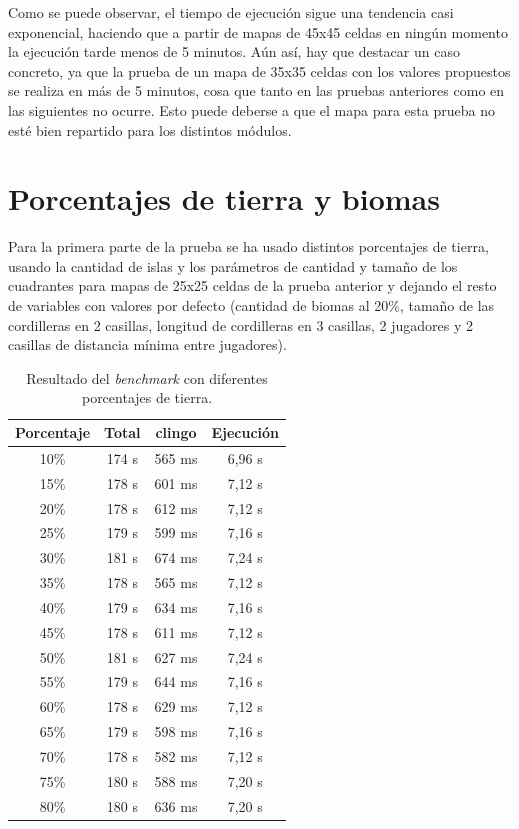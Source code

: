 Como se puede observar, el tiempo de ejecución sigue una tendencia casi exponencial, haciendo que a partir de mapas de 45x45 celdas en ningún momento la ejecución tarde menos de 5 minutos. Aún así, hay que destacar un caso concreto, ya que la prueba de un mapa de 35x35 celdas con los valores propuestos se realiza en más de 5 minutos, cosa que tanto en las pruebas anteriores como en las siguientes no ocurre. Esto puede deberse a que el mapa para esta prueba no esté bien repartido para los distintos módulos.  

\section{Porcentajes de tierra y biomas}
\label{sec:pruebatierrabiomas}

Para la primera parte de la prueba se ha usado distintos porcentajes de tierra, usando la cantidad de islas y los parámetros de cantidad y tamaño de los cuadrantes para mapas de 25x25 celdas de la prueba anterior y dejando el resto de variables con valores por defecto (cantidad de biomas al 20\%, tamaño de las cordilleras en 2 casillas, longitud de cordilleras en 3 casillas, 2 jugadores y 2 casillas de distancia mínima entre jugadores). \\

\begin{table}[!h]
	\centering
	\begin{tabular}{ c c c c }
		\bfseries{Porcentaje} & \bfseries{Total}  & \bfseries{clingo} & \bfseries{Ejecución} \\
		\hline
		10\% & 174 s & 565 ms & 6,96 s \\
		15\% & 178 s & 601 ms & 7,12 s \\
		20\% & 178 s & 612 ms & 7,12 s \\
		25\% & 179 s & 599 ms & 7,16 s \\
		30\% & 181 s & 674 ms & 7,24 s \\
		35\% & 178 s & 565 ms & 7,12 s \\
		40\% & 179 s & 634 ms & 7,16 s \\
		45\% & 178 s & 611 ms & 7,12 s \\
		50\% & 181 s & 627 ms & 7,24 s \\
		55\% & 179 s & 644 ms & 7,16 s \\
		60\% & 178 s & 629 ms & 7,12 s \\
		65\% & 179 s & 598 ms & 7,16 s \\
		70\% & 178 s & 582 ms & 7,12 s \\
		75\% & 180 s & 588 ms & 7,20 s \\
		80\% & 180 s & 636 ms & 7,20 s \\
		\hline
	\end{tabular}
	\caption{Resultado del \textit{benchmark} con diferentes porcentajes de tierra.}\label{table:landresult}
\end{table}

